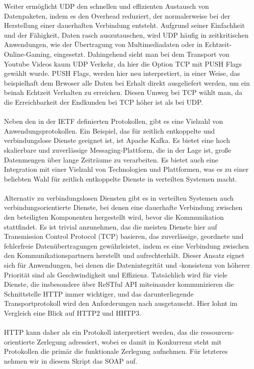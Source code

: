 \documentclass[../vs-script-first-v01.tex]{subfiles}
\begin{document}
Weiter ermöglicht UDP  den schnellen und effizienten Austausch von Datenpaketen, indem es den Overhead reduziert, der normalerweise bei der Herstellung einer dauerhaften Verbindung entsteht. Aufgrund seiner Einfachheit und der Fähigkeit, Daten rasch auszutauschen, wird UDP häufig in zeitkritischen Anwendungen, wie der Übertragung von Multimediadaten oder in Echtzeit-Online-Gaming, eingesetzt. Dahingehend sieht man bei dem Transport von Youtube Videos kaum UDP Verkehr, da hier die Option TCP mit PUSH Flags gewählt wurde. PUSH Flags, werden hier neu interpretiert, in einer Weise, das beispielhaft dem Brwoser alle Daten bei Erhalt direkt ausgeliefert werden, um ein beinah Echtzeit Verhalten zu erreichen. Diesen Umweg bei TCP wählt man, da die Erreichbarkeit der Endkunden bei TCP höher ist als bei UDP.
\\\\
Neben den in der IETF definierten Protokollen, gibt es eine Vielzahl von Anwendungsprotokollen. Ein Beispiel, das für zeitlich entkoppelte und verbindungslose Dienste geeignet ist, ist Apache Kafka. Es bietet eine hoch skalierbare und zuverlässige Messaging-Plattform, die in der Lage ist, große Datenmengen über lange Zeiträume zu verarbeiten. Es bietet auch eine Integration mit einer Vielzahl von Technologien und Plattformen, was es zu einer beliebten Wahl für zeitlich entkoppelte Dienste in verteilten Systemen macht.
\\\\
Alternativ zu verbindungslosen Diensten gibt es in verteilten Systemen auch verbindungsorientierte Dienste, bei denen eine dauerhafte Verbindung zwischen den beteiligten Komponenten hergestellt wird, bevor die Kommunikation stattfindet. Es ist trivial anzunehmen, das die meisten Dienste hier auf Transmission Control Protocol (TCP) basieren, das zuverlässige, geordnete und fehlerfreie Datenübertragungen gewährleistet, indem es eine Verbindung zwischen den Kommunikationspartnern herstellt und aufrechterhält. Dieser Ansatz eignet sich für Anwendungen, bei denen die Datenintegrität und -konsistenz von höherer Priorität sind als Geschwindigkeit und Effizienz. Tatsächlich wird für viele Dienste, die insbesondere über ReSTful API miteinander kommunizieren die Schnittstelle HTTP immer wichtiger, und das darunterliegende Transportprotokoll wird den Anforderungen nach ausgetauscht. Hier lohnt im Vergleich eine Blick auf HTTP2 und HHTP3.
\\\\
HTTP kann daher als ein Protokoll interpretiert werden, das die ressourcen-orientierte Zerlegung adressiert, wobei es damit in Konkurrenz steht mit Protokollen die primär die funktionale Zerlegung aufnehmen. Für letzteres nehmen wir in diesem Skript das SOAP auf. 
\end{document}
